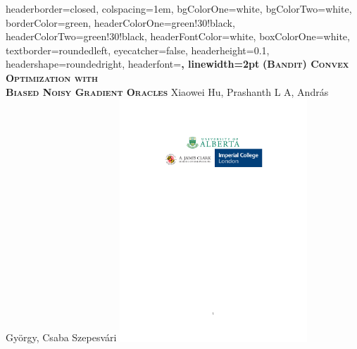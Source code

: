 \documentclass[portrait,a0paper,fontscale=0.285]{baposter} %
\begin{document}
\begin{poster}
{
headerborder=closed, %
colspacing=1em, %
bgColorOne=white, %
bgColorTwo=white, %
borderColor=green, %
headerColorOne=green!30!black, %
headerColorTwo=green!30!black, %
headerFontColor=white, %
boxColorOne=white, %
textborder=roundedleft, %
eyecatcher=false, %
headerheight=0.1\textheight, %
headershape=roundedright, %
headerfont=\Large\bf\textsc, %
linewidth=2pt %
}
%
{}
{\bf\textsc{(Bandit) Convex Optimization with\\ Biased Noisy Gradient Oracles}\vspace{0.5em}} %
{ Xiaowei  Hu, Prashanth L A, Andr\'as Gy\"orgy, Csaba Szepesv\'ari } %
{
\includegraphics[width=19em]{logo.pdf}
} %




\end{poster}
\end{document}
